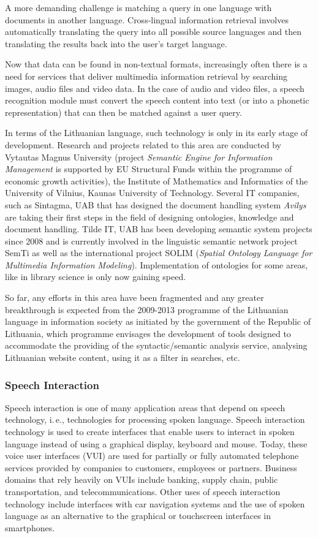 \begin{multicols}{2}
A more demanding challenge is matching a query in one language with documents in another language. Cross-lingual information retrieval involves automatically translating the query into all possible source languages and then translating the results back into the user's target language.

Now that data can be found in non-textual formats, increasingly often there is a need for services that deliver multimedia information retrieval by searching images, audio files and video data. In the case of audio and video files, a speech recognition module must convert the speech content into text (or into a phonetic representation) that can then be matched against a user query.

   In terms of the Lithuanian language, such technology is only in its early stage of development. Research and projects related to this area are conducted by Vytautas Magnus University (project \textit{Semantic Engine for Information Management} is supported by EU Structural Funds within the programme of economic growth activities), the Institute of Mathematics and Informatics of the University of Vilnius, Kaunas University of Technology. Several IT companies, such as Sintagma, UAB that has designed the document handling system \textit{Avilys} are taking their first steps in the field of designing ontologies, knowledge and document handling. Tilde IT, UAB has been developing semantic system projects since 2008 and is currently involved in the linguistic semantic network project SemTi as well as the international project SOLIM (\textit{Spatial Ontology Language for Multimedia Information Modeling}). Implementation of ontologies for some areas, like in library science is only now gaining speed.

    So far, any efforts in this area have been fragmented and any greater breakthrough is expected from the 2009-2013 programme of the Lithuanian language in information society as initiated by the government of the Republic of Lithuania, which programme envisages the development of tools designed to accommodate the providing of the syntactic/semantic analysis service, analysing Lithuanian website content, using it as a filter in searches, etc.

\subsubsection{Speech Interaction}

Speech interaction is one of many application areas that depend on speech technology, i.\,e., technologies for processing spoken language. Speech interaction technology is used to create interfaces that enable users to interact in spoken language instead of using a graphical display, keyboard and mouse.  Today, these voice user interfaces (VUI) are used for partially or fully automated telephone services provided by companies to customers, employees or partners. Business domains that rely heavily on VUIs include banking, supply chain, public transportation, and telecommunications. Other uses of speech interaction technology include interfaces with car navigation systems and the use of spoken language as an alternative to the graphical or touchscreen interfaces in smartphones.


\end{multicols}
